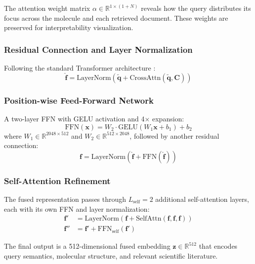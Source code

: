 \documentclass[conference]{IEEEtran}
\begin{document}
The attention weight matrix $\alpha \in \mathbb{R}^{1 \times (1+N)}$ reveals how the query distributes its focus across the molecule and each retrieved document. These weights are preserved for interpretability visualization.

\subsubsection{Residual Connection and Layer Normalization}
Following the standard Transformer architecture \cite{vaswani2017attention}:
\begin{equation}
    \hat{\mathbf{f}} = \text{LayerNorm}(\tilde{\mathbf{q}} + \text{CrossAttn}(\tilde{\mathbf{q}}, \mathbf{C}))
\end{equation}

\subsubsection{Position-wise Feed-Forward Network}
A two-layer FFN with GELU activation \cite{hendrycks2016gelu} and 4$\times$ expansion:
\begin{equation}
    \text{FFN}(\mathbf{x}) = W_2 \cdot \text{GELU}(W_1 \mathbf{x} + b_1) + b_2
\end{equation}
where $W_1 \in \mathbb{R}^{2048 \times 512}$ and $W_2 \in \mathbb{R}^{512 \times 2048}$, followed by another residual connection:
\begin{equation}
    \mathbf{f} = \text{LayerNorm}(\hat{\mathbf{f}} + \text{FFN}(\hat{\mathbf{f}}))
\end{equation}

\subsubsection{Self-Attention Refinement}
The fused representation passes through $L_{\text{self}} = 2$ additional self-attention layers, each with its own FFN and layer normalization:
\begin{align}
    \mathbf{f}' &= \text{LayerNorm}(\mathbf{f} + \text{SelfAttn}(\mathbf{f}, \mathbf{f}, \mathbf{f})) \\
    \mathbf{f}'' &= \mathbf{f}' + \text{FFN}_{\text{self}}(\mathbf{f}')
\end{align}

The final output is a 512-dimensional fused embedding $\mathbf{z} \in \mathbb{R}^{512}$ that encodes query semantics, molecular structure, and relevant scientific literature.
\end{document}
